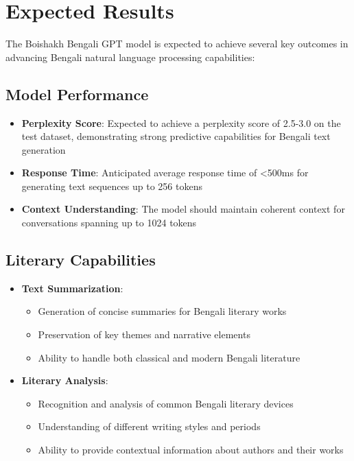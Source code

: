 \section{Expected Results}
The Boishakh Bengali GPT model is expected to achieve several key outcomes in advancing Bengali natural language processing capabilities:

\subsection{Model Performance}
\begin{itemize}
    \item \textbf{Perplexity Score}: Expected to achieve a perplexity score of 2.5-3.0 on the test dataset, demonstrating strong predictive capabilities for Bengali text generation
    
    \item \textbf{Response Time}: Anticipated average response time of <500ms for generating text sequences up to 256 tokens
    
    \item \textbf{Context Understanding}: The model should maintain coherent context for conversations spanning up to 1024 tokens
\end{itemize}

\subsection{Literary Capabilities}
\begin{itemize}
    \item \textbf{Text Summarization}: 
    \begin{itemize}
        \item Generation of concise summaries for Bengali literary works
        \item Preservation of key themes and narrative elements
        \item Ability to handle both classical and modern Bengali literature
    \end{itemize}
    
    \item \textbf{Literary Analysis}:
    \begin{itemize}
        \item Recognition and analysis of common Bengali literary devices
        \item Understanding of different writing styles and periods
        \item Ability to provide contextual information about authors and their works
    \end{itemize}
\end{itemize}

